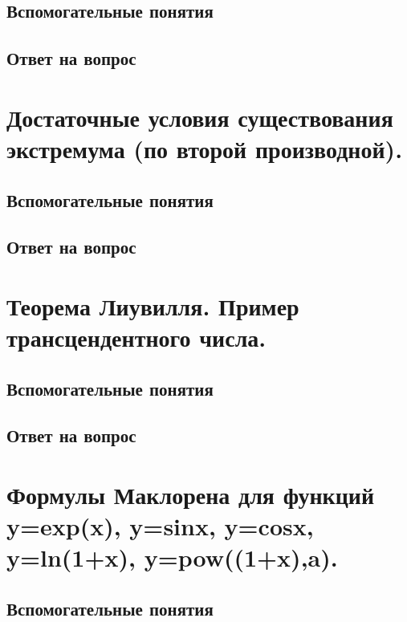 \documentclass[12pt,a4paper]{article}
\begin{document}
\subsection*{Вспомогательные понятия}


\subsection*{Ответ на вопрос}


\newpage
\section{Достаточные условия существования экстремума (по второй производной).}

\subsection*{Вспомогательные понятия}


\subsection*{Ответ на вопрос}


\newpage
\section{Теорема Лиувилля. Пример трансцендентного числа.}

\subsection*{Вспомогательные понятия}


\subsection*{Ответ на вопрос}


\newpage
\section{Формулы Маклорена для функций y=exp(x), y=sinx, y=cosx, y=ln(1+x), y=pow((1+x),a).}

\subsection*{Вспомогательные понятия}

\end{document}
